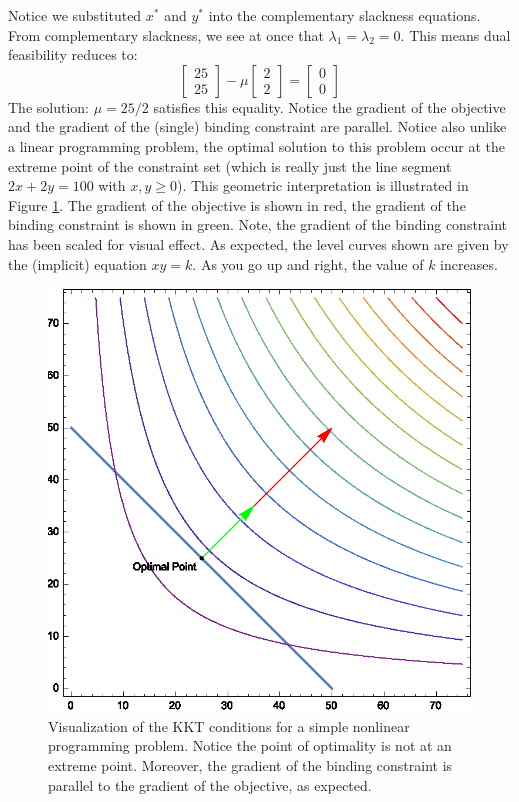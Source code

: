 Notice we substituted $x^*$ and $y^*$ into the complementary slackness equations. From complementary slackness, we see at once that $\lambda_1 = \lambda_2 = 0$. This means dual feasibility reduces to:
\begin{equation}
\begin{bmatrix}25\\25\end{bmatrix} - \mu\begin{bmatrix}2\\2\end{bmatrix} = \begin{bmatrix}0\\0\end{bmatrix}
\end{equation}
The solution: $\mu = 25/2$ satisfies this equality. Notice the gradient of the objective and the gradient of the (single) binding constraint are parallel. Notice also unlike a linear programming problem, the optimal solution to this problem  occur at the extreme point of the constraint set (which is really just the line segment $2x + 2y = 100$ with $x,y\geq 0$). This geometric interpretation is illustrated in Figure \ref{fig:KKTNLP}. The gradient of the objective is shown in red, the gradient of the binding constraint is shown in green. Note, the gradient of the binding constraint has been scaled for visual effect. As expected, the level curves shown are given by the (implicit) equation $xy = k$. As you go up and right, the value of $k$ increases.
\begin{figure}[htbp]
\centering
\includegraphics[scale=0.75]{imported_figures/KKTNLP.eps}
\caption{Visualization of the KKT conditions for a simple nonlinear programming problem. Notice the point of optimality is not at an extreme point. Moreover, the gradient of the binding constraint is parallel to the gradient of the objective, as expected. }
\label{fig:KKTNLP}
\end{figure}

